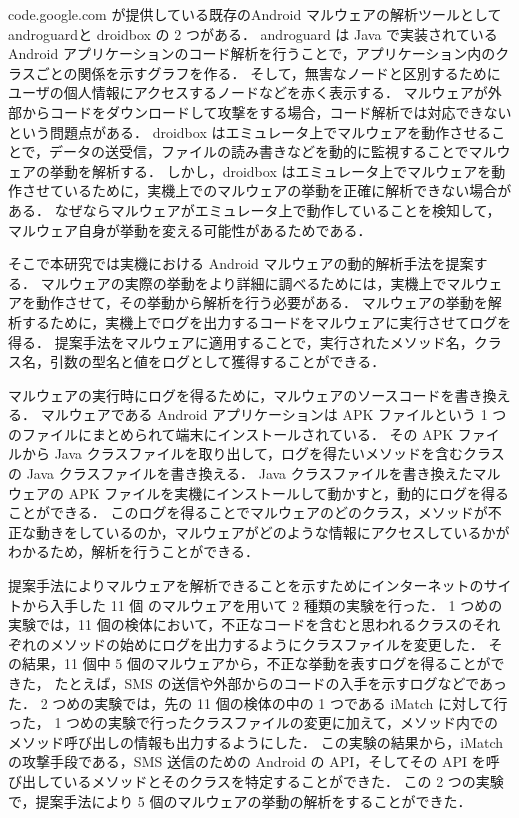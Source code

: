 code.google.com が提供している既存のAndroid マルウェアの解析ツールとして androguard\cite{aguard}と droidbox\cite{dbox} の 2 つがある．
androguard は Java で実装されている Android アプリケーションのコード解析を行うことで，アプリケーション内のクラスごとの関係を示すグラフを作る．
そして，無害なノードと区別するためにユーザの個人情報にアクセスするノードなどを赤く表示する．
マルウェアが外部からコードをダウンロードして攻撃をする場合，コード解析では対応できないという問題点がある．
droidbox はエミュレータ上でマルウェアを動作させることで，データの送受信，ファイルの読み書きなどを動的に監視することでマルウェアの挙動を解析する．
しかし，droidbox はエミュレータ上でマルウェアを動作させているために，実機上でのマルウェアの挙動を正確に解析できない場合がある．
なぜならマルウェアがエミュレータ上で動作していることを検知して，マルウェア自身が挙動を変える可能性があるためである．

そこで本研究では実機における Android マルウェアの動的解析手法を提案する．
マルウェアの実際の挙動をより詳細に調べるためには，実機上でマルウェアを動作させて，その挙動から解析を行う必要がある．
マルウェアの挙動を解析するために，実機上でログを出力するコードをマルウェアに実行させてログを得る．
提案手法をマルウェアに適用することで，実行されたメソッド名，クラス名，引数の型名と値をログとして獲得することができる．

マルウェアの実行時にログを得るために，マルウェアのソースコードを書き換える．
マルウェアである Android アプリケーションは APK ファイルという 1 つのファイルにまとめられて端末にインストールされている．
その APK ファイルから Java クラスファイルを取り出して，ログを得たいメソッドを含むクラスの Java クラスファイルを書き換える．
Java クラスファイルを書き換えたマルウェアの APK ファイルを実機にインストールして動かすと，動的にログを得ることができる．
このログを得ることでマルウェアのどのクラス，メソッドが不正な動きをしているのか，マルウェアがどのような情報にアクセスしているかがわかるため，解析を行うことができる．

提案手法によりマルウェアを解析できることを示すためにインターネットのサイト\cite{malwaresite}から入手した 11 個 のマルウェアを用いて 2 種類の実験を行った．
1 つめの実験では，11 個の検体において，不正なコードを含むと思われるクラスのそれぞれのメソッドの始めにログを出力するようにクラスファイルを変更した．
その結果，11 個中 5 個のマルウェアから，不正な挙動を表すログを得ることができた，
たとえば，SMS の送信や外部からのコードの入手を示すログなどであった．
2 つめの実験では，先の 11 個の検体の中の 1 つである iMatch に対して行った，
1 つめの実験で行ったクラスファイルの変更に加えて，メソッド内でのメソッド呼び出しの情報も出力するようにした．
この実験の結果から，iMatch の攻撃手段である，SMS 送信のための Android の API，そしてその API を呼び出しているメソッドとそのクラスを特定することができた．
この 2 つの実験で，提案手法により 5 個のマルウェアの挙動の解析をすることができた．

